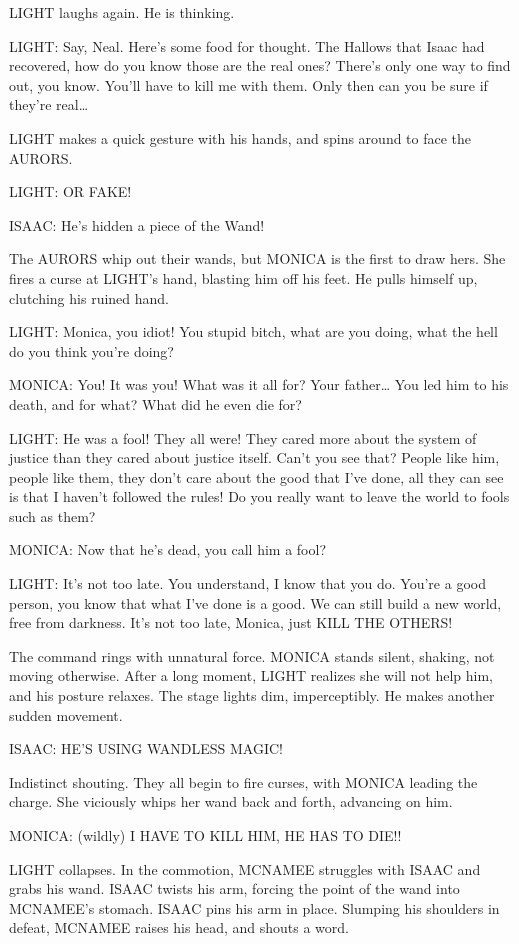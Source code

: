 LIGHT laughs again. He is thinking.

LIGHT: Say, Neal. Here’s some food for thought. The Hallows that Isaac had recovered, how do you know those are the real ones? There’s only one way to find out, you know. You’ll have to kill me with them. Only then can you be sure if they’re real…

LIGHT makes a quick gesture with his hands, and spins around to face the AURORS.

LIGHT: OR FAKE!

ISAAC: He’s hidden a piece of the Wand!

The AURORS whip out their wands, but MONICA is the first to draw hers. She fires a curse at LIGHT’s hand, blasting him off his feet. He pulls himself up, clutching his ruined hand.

LIGHT: Monica, you idiot! You stupid bitch, what are you doing, what the hell do you think you’re doing?

MONICA: You! It was you! What was it all for? Your father… You led him to his death, and for what? What did he even die for?

LIGHT: He was a fool! They all were! They cared more about the system of justice than they cared about justice itself. Can’t you see that? People like him, people like them, they don’t care about the good that I’ve done, all they can see is that I haven’t followed the rules! Do you really want to leave the world to fools such as them?

MONICA: Now that he’s dead, you call him a fool?

LIGHT: It’s not too late. You understand, I know that you do. You’re a good person, you know that what I’ve done is a good. We can still build a new world, free from darkness. It’s not too late, Monica, just KILL THE OTHERS!

The command rings with unnatural force. MONICA stands silent, shaking, not moving otherwise. After a long moment, LIGHT realizes she will not help him, and his posture relaxes. The stage lights dim, imperceptibly. He makes another sudden movement.

ISAAC: HE’S USING WANDLESS MAGIC!

Indistinct shouting. They all begin to fire curses, with MONICA leading the charge. She viciously whips her wand back and forth, advancing on him.

MONICA: (wildly) I HAVE TO KILL HIM, HE HAS TO DIE!!

LIGHT collapses. In the commotion, MCNAMEE struggles with ISAAC and grabs his wand. ISAAC twists his arm, forcing the point of the wand into MCNAMEE’s stomach. ISAAC pins his arm in place. Slumping his shoulders in defeat, MCNAMEE raises his head, and shouts a word.

